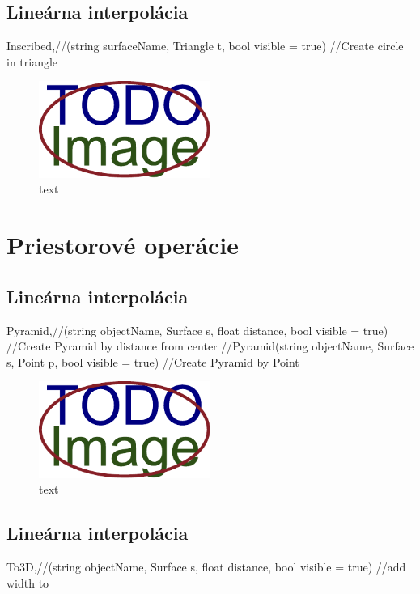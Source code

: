 \subsection{Lineárna interpolácia}
	Inscribed,//(string surfaceName, Triangle t, bool visible = true)		//Create circle in triangle

\begin{figure}[H]
	\centering
	\includegraphics[width=0.5\textwidth]{obrazky-figures/placeholder.pdf}
	\caption{text}
	\label{fig:1}
\end{figure}







\section{Priestorové operácie}


\subsection{Lineárna interpolácia}
Pyramid,//(string objectName, Surface s, float distance, bool visible = true) //Create Pyramid by distance from center
//Pyramid(string objectName, Surface s, Point p, bool visible = true) //Create Pyramid by Point

\begin{figure}[H]
	\centering
	\includegraphics[width=0.5\textwidth]{obrazky-figures/placeholder.pdf}
	\caption{text}
	\label{fig:1}
\end{figure}


\subsection{Lineárna interpolácia}
To3D,//(string objectName, Surface s, float distance, bool visible = true) //add width to 

